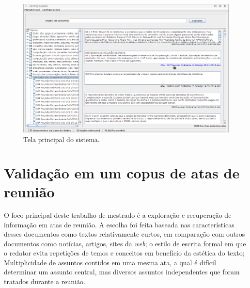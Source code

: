   \begin{figure}[!h]
	  \centering
	  \includegraphics[width=\textwidth]{conteudo/capitulos/figs/tela-principal-2-1.png}
	  \caption{Tela principal do sistema.}
	  \label{fig:tela-principal}
  \end{figure}










\section{Validação em um copus de atas de reunião}	
\label{sec:aplicacao-sistema}

O foco principal deste trabalho de mestrado é a exploração e recuperação de informação em atas de reunião. A escolha foi feita baseada nas características desses documentos como textos relativamente curtos, em comparação com outros documentos como notícias, artigos, sites da \textit{web}; o estilo de escrita formal em que o redator evita repetições de temos e conceitos em benefício da estética do texto; Multiplicidade de assuntos contidos em uma mesma ata, a qual é difícil determinar um assunto central, mas diversos assuntos independentes que foram tratados durante a reunião.





